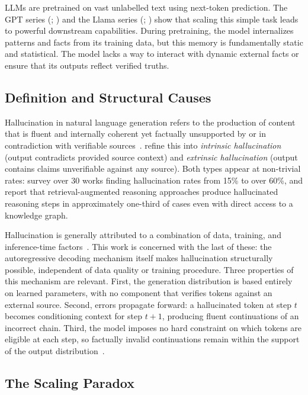 LLMs are pretrained on vast unlabelled text using next-token prediction. The GPT series (\citealt{brown2020gpt3}; \citealt{openai2024gpt4technicalreport}) and the Llama series (\citealt{touvron2023llama}; \citealt{dubey2024llama3}) show that scaling this simple task leads to powerful downstream capabilities. During pretraining, the model internalizes patterns and facts from its training data, but this memory is fundamentally static and statistical. The model lacks a way to interact with dynamic external facts or ensure that its outputs reflect verified truths.

\subsection{Definition and Structural Causes}

Hallucination in natural language generation refers to the production of content that is fluent and internally coherent yet factually unsupported by or in contradiction with verifiable sources~\citep{ji2023survey}. \citet{huang2023survey} refine this into \textit{intrinsic hallucination} (output contradicts provided source context) and \textit{extrinsic hallucination} (output contains claims unverifiable against any source). Both types appear at non-trivial rates: \citet{ji2023survey} survey over 30 works finding hallucination rates from 15\% to over 60\%, and \citet{luo2025-graph-constrained-reasoning} report that retrieval-augmented reasoning approaches produce hallucinated reasoning steps in approximately one-third of cases even with direct access to a knowledge graph.

Hallucination is generally attributed to a combination of data, training, and inference-time factors~\citep{huang2023survey}. This work is concerned with the last of these: the autoregressive decoding mechanism itself makes hallucination structurally possible, independent of data quality or training procedure. Three properties of this mechanism are relevant. First, the generation distribution is based entirely on learned parameters, with no component that verifies tokens against an external source. Second, errors propagate forward: a hallucinated token at step $t$ becomes conditioning context for step $t{+}1$, producing fluent continuations of an incorrect chain. Third, the model imposes no hard constraint on which tokens are eligible at each step, so factually invalid continuations remain within the support of the output distribution~\citep{brown2020gpt3}.

\subsection{The Scaling Paradox}

